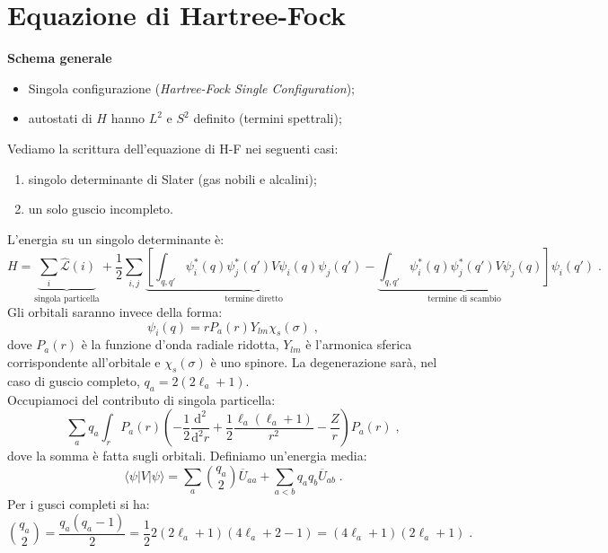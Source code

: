 \documentclass[10pt,a4paper]{report}
\theoremstyle{definition}
\newcommand{\lag}{\mathcal{L}}
\numberwithin{equation}{section}
\newcommand{\diff}[1][]{\mathrm{d}#1}
\newcommand{\bra}{\langle}
\newcommand{\ket}{\rangle}
\begin{document}
\section{Equazione di Hartree-Fock}
\textbf{Schema generale}
\begin{itemize}
\item Singola configurazione (\emph{Hartree-Fock Single Configuration});
\item autostati di $H$ hanno $L^2$ e $S^2$ definito (termini spettrali);
\end{itemize}
Vediamo la scrittura dell'equazione di H-F nei seguenti casi:
\begin{enumerate}
\item singolo determinante di Slater (gas nobili e alcalini);
\item un solo guscio incompleto.
\end{enumerate}
L'energia su un singolo determinante è:
\begin{equation}
H=\underbrace{\sum_i \hat{\lag}(i)}_{\mbox{singola particella}}+\frac{1}{2}\sum_{i,j}\underbrace{\left[\int_{q,q'}\psi_i^*(q)\psi_j^*(q')V\psi_i(q)\psi_j(q')\right.}_{\mbox{termine diretto}}-\underbrace{\left.\int_{q,q'}\psi_i^*(q)\psi_j^*(q')V\psi_j(q)\right]}_{\mbox{termine di scambio}}\psi_i(q')\;.
\end{equation}
Gli orbitali saranno invece della forma:
\begin{equation}
\psi_i(q)=rP_a(r)Y_{lm}\chi_s(\sigma)\;,
\end{equation}
dove $P_a(r)$ è la funzione d'onda radiale ridotta, $Y_{lm}$ è l'armonica sferica corrispondente all'orbitale e $\chi_s(\sigma)$ è uno spinore. La degenerazione sarà, nel caso di guscio completo, $q_a=2(2\ell_a+1)$. \\
Occupiamoci del contributo di singola particella:
\begin{equation}
\sum_a q_a\int_r P_a(r)\left(-\frac{1}{2}\frac{\diff^2}{\diff^2{r}}+\frac{1}{2}\frac{\ell_a(\ell_a+1)}{r^2}-\frac{Z}{r}\right)P_a(r)\;,
\end{equation}
dove la somma è fatta sugli orbitali. Definiamo un'energia media:
\begin{equation}
\bra\psi|V|\psi\ket=\sum_a \binom{q_a}{2}\overline{U}_{aa}+\sum_{a<b}q_aq_b\overline{U}_{ab}\;.
\end{equation}
Per i gusci completi si ha:
\begin{equation}
\binom{q_a}{2}=\frac{q_a(q_a-1)}{2}=\frac{1}{2}2(2\ell_a+1)(4\ell_a+2-1)=(4\ell_a+1)(2\ell_a+1)\;.
\end{equation}
\end{document}
